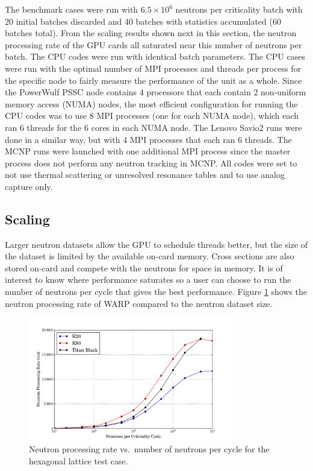 \documentclass[preprint,12pt]{elsarticle}
\begin{document}
The benchmark cases were run with $6.5\times10^6$ neutrons per criticality batch with 20 initial batches discarded and 40 batches with statistics accumulated (60 batches total).  From the scaling results shown next in this section, the neutron processing rate of the GPU cards all saturated near this number of neutrons per batch.  The CPU codes were run with identical batch parameters.  The CPU cases were run with the optimal number of MPI processes and threads per process for the specific node to fairly measure the performance of the unit as a whole.  Since the PowerWulf PSSC node contains 4 processors that each contain 2 non-uniform memory access (NUMA) nodes, the most efficient configuration for running the CPU codes was to use 8 MPI processes (one for each NUMA node), which each ran 6 threads for the 6 cores in each NUMA node.  The Lenovo Savio2 runs were done in a similar way, but with 4 MPI processes that each ran 6 threads.  The MCNP runs were launched with one additional MPI process since the master process does not perform any neutron tracking in MCNP.  All codes were set to not use thermal scattering or unresolved resonance tables and to use analog capture only.

\subsection{Scaling}

Larger neutron datasets allow the GPU to schedule threads better, but the size of the dataset is limited by the available on-card memory.  Cross sections are also stored on-card and compete with the neutrons for space in memory.  It is of interest to know where performance saturates so a user can choose to run the number of neutrons per cycle that gives the best performance.  Figure \ref{scaling} shows the neutron processing rate of WARP compared to the neutron dataset size.

\begin{figure}[h!]
\centering
\includegraphics[width=0.8\textwidth,trim= 1cm 0cm 1cm 0cm]{graphics/scaling.pdf}
\caption{Neutron processing rate vs.\ number of neutrons per cycle for the hexagonal lattice test case. \label{scaling} }
\end{figure}
\end{document}

